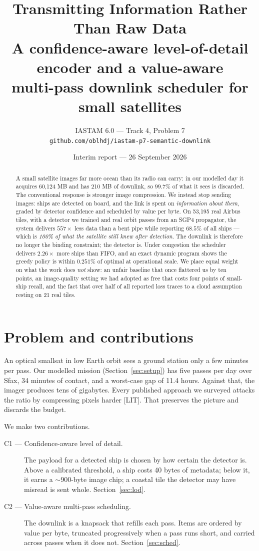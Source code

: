 \documentclass[10pt,a4paper]{article}
\title{\textbf{Transmitting Information Rather Than Raw Data}\\[2pt]
\large A confidence-aware level-of-detail encoder and a value-aware\\
multi-pass downlink scheduler for small satellites}
\author{IASTAM 6.0 --- Track 4, Problem 7\\
\small\texttt{github.com/oblhdj/iastam-p7-semantic-downlink}}
\date{Interim report --- 26 September 2026}
\newcommand{\LIT}{\textcolor{lit}{\footnotesize\textsf{[LIT]}}}
\begin{document}
\maketitle

\begin{abstract}
\noindent
A small satellite images far more ocean than its radio can carry: in our modelled day it
acquires 60{,}124 MB and has 210 MB of downlink, so $99.7\%$ of what it sees is
discarded. The conventional response is stronger image compression. We instead stop sending
images: ships are detected on board, and the link is spent on \emph{information about them},
graded by detector confidence and scheduled by value per byte. On 53{,}195 real Airbus tiles,
with a detector we trained and real orbit passes from an SGP4 propagator, the system delivers
$557\times$ less data than a bent pipe while reporting $68.5\%$ of all ships --- which is
\emph{100\% of what the satellite still knew after detection}. The downlink is therefore no
longer the binding constraint; the detector is. Under congestion the scheduler delivers
$2.26\times$ more ships than FIFO, and an exact dynamic program shows the greedy policy is
within $0.251\%$ of optimal at operational scale. We place equal weight on what the work does
\emph{not} show: an unfair baseline that once flattered us by ten points, an image-quality
setting we had adopted as free that costs four points of small-ship recall, and the fact that
over half of all reported loss traces to a cloud assumption resting on 21 real tiles.
\end{abstract}

\section{Problem and contributions}

An optical smallsat in low Earth orbit sees a ground station only a few minutes per pass. Our
modelled mission (Section~\ref{sec:setup}) has five passes per day over Sfax, 34 minutes of
contact, and a worst-case gap of 11.4 hours. Against that, the imager produces tens of gigabytes.
Every published approach we surveyed attacks the ratio by compressing pixels harder
\LIT. That preserves the picture and discards the budget.

We make two contributions.

\begin{description}
\item[C1 --- Confidence-aware level of detail.] The payload for a detected ship is chosen by how
  certain the detector is. Above a calibrated threshold, a ship costs 40 bytes of metadata; below
  it, it earns a $\sim$900-byte image chip; a coastal tile the detector may have misread is sent
  whole. Section~\ref{sec:lod}.
\item[C2 --- Value-aware multi-pass scheduling.] The downlink is a knapsack that refills each
  pass. Items are ordered by value per byte, truncated progressively when a pass runs short, and
  carried across passes when it does not. Section~\ref{sec:sched}.
\end{description}
\end{document}
